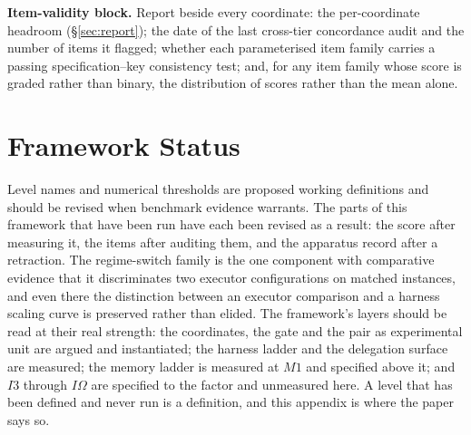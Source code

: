 \documentclass[11pt]{article}
\theoremstyle{definition}
\newcommand{\Om}{\ensuremath{\Omega}}
\begin{document}
\noindent\textbf{Item-validity block.} Report beside every coordinate: the per-coordinate headroom (\S\ref{sec:report}); the date of the last cross-tier concordance audit and the number of items it flagged; whether each parameterised item family carries a passing specification--key consistency test; and, for any item family whose score is graded rather than binary, the distribution of scores rather than the mean alone.

\section{Framework Status}

Level names and numerical thresholds are proposed working definitions and should be revised when benchmark evidence warrants. The parts of this framework that have been run have each been revised as a result: the score after measuring it, the items after auditing them, and the apparatus record after a retraction. The regime-switch family is the one component with comparative evidence that it discriminates two executor configurations on matched instances, and even there the distinction between an executor comparison and a harness scaling curve is preserved rather than elided. The framework's layers should be read at their real strength: the coordinates, the gate and the pair as experimental unit are argued and instantiated; the harness ladder and the delegation surface are measured; the memory ladder is measured at $M1$ and specified above it; and $I3$ through $I\Om{}$ are specified to the factor and unmeasured here. A level that has been defined and never run is a definition, and this appendix is where the paper says so.
\end{document}
